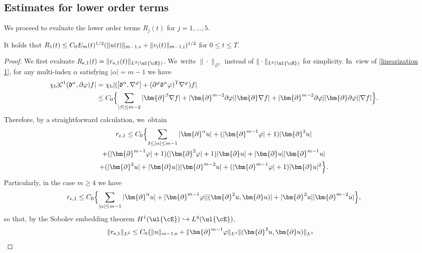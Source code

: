 \subsection{Estimates for lower order terms}\label{sectestLOT}
We proceed to evaluate the lower order terms $R_j(t)$ for $j=1,\ldots,5$.

\begin{lemma}\label{lem:EstR1}
It holds that $R_1(t) \leq C_0E_m(t)^{1/2}(\|u(t)\|_{m-1,{\rm e}}+\|v_\mathrm{i}(t)\|_{m-1,{\rm i}})^{1/2}$ for $0\leq t\leq T$.
\end{lemma}

\begin{proof}
We first evaluate $R_{{\rm e},1}(t)=\|r_{{\rm e},1}(t)\|_{L^2(\ul{\cE})}$. We~write $\|\cdot\|_{L^p}$ instead of $\|\cdot\|_{L^p(\ul{\cE})}$ for simplicity. In~view of \eqref{linearization 1}, for any multi-index $\alpha$ satisfying $|\alpha|=m-1$ we have
\begin{align*}
\chi_\mathrm{b}|{\mathcal C}^1(\mathfrak{d}^\alpha,\partial \varphi)f|
&= \chi_\mathrm{b}|([\mathfrak{d}^\alpha,\nabla^\varphi]+(\partial^\varphi\mathfrak{d}^\alpha\varphi)^{\rm T}\nabla^\varphi)f| \\
&\leq C_0 \Bigl\{ \sum_{|\beta|\leq m-2}|\bm{\partial}^\beta\nabla f| + |\bm{\partial}^{m-2}\partial\varphi||\bm{\partial}\nabla f|
+ |\bm{\partial}^{m-2}\partial\varphi||\bm{\partial}\partial\varphi||\nabla f| \Bigr\}.
\end{align*}
Therefore, by a straightforward calculation, we~obtain
\begin{multline*}
r_{{\rm e},1}
\leq C_0\Bigl\{ \sum_{3\leq|\alpha|\leq m-1}|\bm{\partial}^\alpha u| + (|\bm{\partial}^{m-1}\varphi|+1)|\bm{\partial}^2u| \\
+ (|\bm{\partial}^{m-1}\varphi|+1)(|\bm{\partial}^2\varphi|+1)|\bm{\partial}u| + |\bm{\partial}u||\bm{\partial}^{m-1}u| \\
+ (|\bm{\partial}^2u|+|\bm{\partial}u|)|\bm{\partial}^{m-2}u| + (|\bm{\partial}^{m-1}\varphi|+1)|\bm{\partial}u|^2 \Bigr\}.
\end{multline*}
Particularly, in the case $m\geq 4$ we have
\[
r_{{\rm e},1}
\leq C_0 \Bigl\{ \sum_{|\alpha|\leq m-1}|\bm{\partial}^\alpha u| + |\bm{\partial}^{m-1}\varphi||(\bm{\partial}^2u,\bm{\partial}u)|
+ |\bm{\partial}^2u||\bm{\partial}^{m-2}u| \Bigr\},
\]
so that, by the Sobolev embedding theorem $H^1(\ul{\cE}) \hookrightarrow L^4(\ul{\cE})$,
\begin{align*}
\|r_{{\rm e},1}\|_{L^2}
&\leq C_0 \bigl(\|u\|_{m-1,{\rm e}} + \|\bm{\partial}^{m-1}\varphi\|_{L^4}\|(\bm{\partial}^2u,\bm{\partial}u)\|_{L^4}

\end{align*}
\end{proof}
